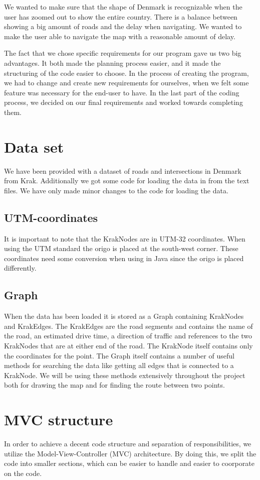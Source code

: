 We wanted to make sure that the shape of Denmark is recognizable when
the user has zoomed out to show the entire country. There is a balance between
showing a big amount of roads and the delay when navigating. We wanted to make
the user able to navigate the map with a reasonable amount of delay. 

The fact that we chose specific requirements for our program gave us two big
advantages. It both made the planning process easier, and it made the
structuring of the code easier to choose. In the process of creating the
program, we had to change and create new requirements for ourselves, when we
felt some feature was necessary for the end-user to have. In the last part of
the coding process, we decided on our final requirements and worked towards completing them. 
\section{Data set}
\label{BG-DS}
We have been provided with a dataset of roads and intersections in Denmark 
from Krak. Additionally we got some code for loading the data in from the 
text files. We have only made minor changes to the code for loading the data.
\subsection{UTM-coordinates}
\label{BG-DS-UTM}
It is important to note that the KrakNodes are in UTM-32 coordinates. When 
using the UTM standard the origo is placed at the south-west corner. These 
coordinates need some conversion when using in Java since the origo is placed 
differently.
\subsection{Graph}
\label{BG-DS-G}
When the data has been loaded it is stored as a Graph containing KrakNodes 
and KrakEdges. The KrakEdges are the road segments and contains the name 
of the road, an estimated drive time, a direction of traffic and references 
to the two KrakNodes that are at either end of the road.  The KrakNode itself 
contains only the coordinates for the point.
The Graph itself contains a number of useful methods for searching the data 
like getting all edges that is connected to a KrakNode. We will be using these 
methods extensively throughout the project both for drawing the map and for 
finding the route between two points.
\section{MVC structure}
\label{BG-MVC}
In order to achieve a decent code structure and separation of responsibilities, 
we utilize the Model-View-Controller (MVC) architecture. By doing this, we split 
the code into smaller sections, which can be easier to handle and easier to 
coorporate on the code.

